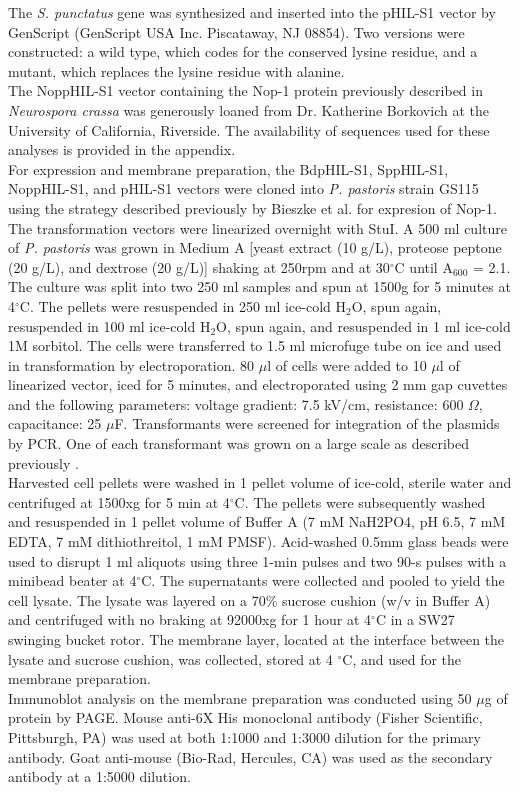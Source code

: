 \indent The \textit{S. punctatus} gene was synthesized and inserted into the pHIL-S1 vector by GenScript (GenScript USA Inc. Piscataway, NJ 08854). Two versions were constructed: a wild type, which codes for the conserved lysine residue, and a mutant, which replaces the lysine residue with alanine.  \\
\indent The NoppHIL-S1 vector containing the Nop-1 protein previously described in \textit{Neurospora crassa} \cite{Bieszke1999} was generously loaned from Dr. Katherine Borkovich at the University of California, Riverside. The availability of sequences used for these analyses is provided in the appendix.\\
\indent For expression and membrane preparation, the BdpHIL-S1, SppHIL-S1, NoppHIL-S1, and pHIL-S1 vectors were cloned into \textit{P. pastoris} strain GS115 using the strategy described previously by Bieszke et al. \nocite{Bieszke1999} for expresion of Nop-1. The transformation vectors were linearized overnight with StuI. A 500 ml culture of \textit{P. pastoris} was grown in Medium A [yeast extract (10 g/L), proteose peptone (20 g/L), and dextrose (20 g/L)] shaking at 250rpm and at 30$^{\circ}$C until A$_{600}$ = 2.1. The culture was split into two 250 ml samples and spun at 1500g for 5 minutes at 4$^{\circ}$C. The pellets were resuspended in 250 ml ice-cold H$_{2}$O, spun again, resuspended in 100 ml ice-cold H$_{2}$O, spun again, and resuspended in 1 ml ice-cold 1M sorbitol. The cells were transferred to 1.5 ml microfuge tube on ice and used in transformation by electroporation. 80 $\mu$l of cells were added to 10 $\mu$l of linearized vector, iced for 5 minutes, and electroporated using 2 mm gap cuvettes and the following parameters: voltage gradient: 7.5 kV/cm, resistance: 600 $\Omega$, capacitance: 25 $\mu$F. Transformants were screened for integration of the plasmids by PCR. One of each transformant was grown on a large scale as described previously \cite{Bieszke1999}.\\
\indent Harvested cell pellets were washed in 1 pellet volume of ice-cold, sterile water and centrifuged at 1500xg for 5 min at 4$^{\circ}$C. The pellets were subsequently washed and resuspended in 1 pellet volume of Buffer A (7 mM NaH2PO4, pH 6.5, 7 mM EDTA, 7 mM dithiothreitol, 1 mM PMSF). Acid-washed 0.5mm glass beads were used to disrupt 1 ml aliquots using three 1-min pulses and two 90-s pulses with a minibead beater at 4$^{\circ}$C. The supernatants were collected and pooled to yield the cell lysate. The lysate was layered on a 70\% sucrose cushion (w/v in Buffer A) and centrifuged with no braking at 92000xg for 1 hour at 4$^{\circ}$C in a SW27 swinging bucket rotor. The membrane layer, located at the interface between the lysate and sucrose cushion, was collected, stored at 4 $^{\circ}$C, and used for the membrane preparation.\\
\indent Immunoblot analysis on the membrane preparation was conducted using 50 $\mu$g of protein by PAGE. Mouse anti-6X His monoclonal antibody (Fisher Scientific, Pittsburgh, PA) was used at both 1:1000 and 1:3000 dilution for the primary antibody. Goat anti-mouse (Bio-Rad, Hercules, CA) was used as the secondary antibody at a 1:5000 dilution.\\


